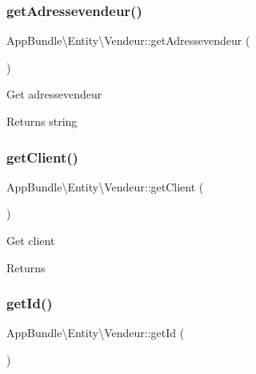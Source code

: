\subsubsection{\texorpdfstring{get\+Adressevendeur()}{getAdressevendeur()}}
{\footnotesize\ttfamily App\+Bundle\textbackslash{}\+Entity\textbackslash{}\+Vendeur\+::get\+Adressevendeur (\begin{DoxyParamCaption}{ }\end{DoxyParamCaption})}

Get adressevendeur

\begin{DoxyReturn}{Returns}
string 
\end{DoxyReturn}
\mbox{\label{class_app_bundle_1_1_entity_1_1_vendeur_ae508685e30ee4ae9659efba6a2d5a071}} 
\subsubsection{\texorpdfstring{get\+Client()}{getClient()}}
{\footnotesize\ttfamily App\+Bundle\textbackslash{}\+Entity\textbackslash{}\+Vendeur\+::get\+Client (\begin{DoxyParamCaption}{ }\end{DoxyParamCaption})}

Get client

\begin{DoxyReturn}{Returns}

\end{DoxyReturn}
\mbox{\label{class_app_bundle_1_1_entity_1_1_vendeur_af33560a6e636353a11f69ea0de5ca60f}} 
\subsubsection{\texorpdfstring{get\+Id()}{getId()}}
{\footnotesize\ttfamily App\+Bundle\textbackslash{}\+Entity\textbackslash{}\+Vendeur\+::get\+Id (\begin{DoxyParamCaption}{ }\end{DoxyParamCaption})}

